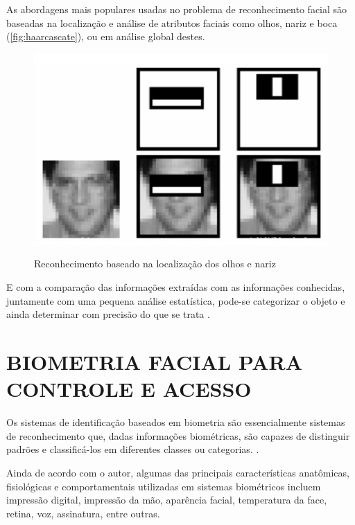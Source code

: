 As abordagens mais populares usadas no problema de reconhecimento facial são 
baseadas na localização e análise de atributos faciais como olhos, nariz e boca (\autoref{fig:haarcascate}), 
ou em análise global destes.

\begin{figure}[h!]
    \centering
    \caption{Reconhecimento baseado na localização dos olhos e nariz}
    \includegraphics[scale=0.25]{figuras/haarcascate.png}
    \label{fig:haarcascate}
    \centering
\end{figure}

E com a comparação das informações extraídas com as informações
conhecidas, juntamente com uma pequena análise estatística, pode-se categorizar o
objeto e ainda determinar com precisão do que se trata \cite{gonzalez2010}.

\section{BIOMETRIA FACIAL PARA CONTROLE E ACESSO}\label{sec:biometriaFacial}

Os sistemas de identificação baseados em biometria são essencialmente sistemas de 
reconhecimento que, dadas informações biométricas, são capazes de distinguir padrões e 
classificá-los em diferentes classes ou categorias. \cite{morais2010}.

Ainda de acordo com o autor, algumas das principais características anatômicas, 
fisiológicas e comportamentais utilizadas em sistemas biométricos incluem 
impressão digital, impressão da mão, aparência facial, temperatura da face, 
retina, voz, assinatura, entre outras.

